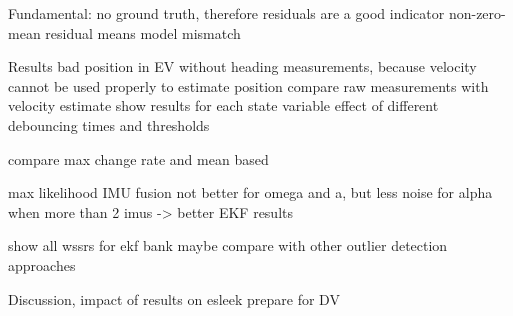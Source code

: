 Fundamental: no ground truth, therefore residuals are a good indicator
non-zero-mean residual means model mismatch~\cite[p.~158]{AlexanderWischnewski.2019}

Results
bad position in EV without heading measurements, because velocity cannot be used properly to estimate position
compare raw measurements with velocity estimate
show results for each state variable
effect of different debouncing times and thresholds

compare max change rate and mean based

max likelihood IMU fusion not better for omega and a, but less noise for alpha when more than 2 imus -> better EKF results

show all wssrs for ekf bank
maybe compare with other outlier detection approaches


Discussion, impact of results on esleek
prepare for DV
